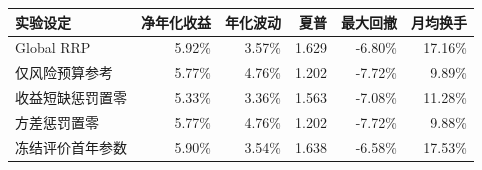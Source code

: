 \begin{tabular}{lrrrrr}
\toprule
实验设定 & 净年化收益 & 年化波动 & 夏普 & 最大回撤 & 月均换手\\\midrule
Global RRP & 5.92\% & 3.57\% & 1.629 & -6.80\% & 17.16\%\\
仅风险预算参考 & 5.77\% & 4.76\% & 1.202 & -7.72\% & 9.89\%\\
收益短缺惩罚置零 & 5.33\% & 3.36\% & 1.563 & -7.08\% & 11.28\%\\
方差惩罚置零 & 5.77\% & 4.76\% & 1.202 & -7.72\% & 9.88\%\\
冻结评价首年参数 & 5.90\% & 3.54\% & 1.638 & -6.58\% & 17.53\%\\
\bottomrule
\end{tabular}